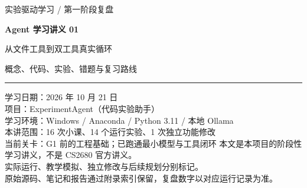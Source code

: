 \documentclass[UTF8,zihao=-4,fontset=fandol]{ctexart}
\begin{document}
\hypersetup{pageanchor=false}
\begin{titlepage}
\vspace*{14mm}
{\large\color{Accent}实验驱动学习 / 第一阶段复盘\par}
\vspace{10mm}
{\Huge\bfseries\color{Ink}Agent 学习讲义 01\par}
\vspace{6mm}
{\LARGE 从文件工具到双工具真实循环\par}
\vspace{12mm}
{\large 概念、代码、实验、错题与复习路线\par}
\vspace{14mm}
\hrule
\vspace{6mm}
学习日期：2026 年 10 月 21 日\\
项目：ExperimentAgent（代码实验助手）\\
学习环境：Windows / Anaconda / Python 3.11 / 本地 Ollama\\
本讲范围：16 次小课、14 个运行实验、1 次独立功能修改\\
当前关卡：G1 前的工程基础；已跑通最小模型与工具闭环
\vfill
\small
本文是本项目的阶段性学习讲义，不是 CS2680 官方讲义。\\
实际运行、教学模拟、独立修改与后续规划分别标记。\\
原始源码、笔记和报告通过附录索引保留，复盘数字以对应运行记录为准。
\end{titlepage}
\hypersetup{pageanchor=true}
\tableofcontents
\clearpage
{}

\end{document}
